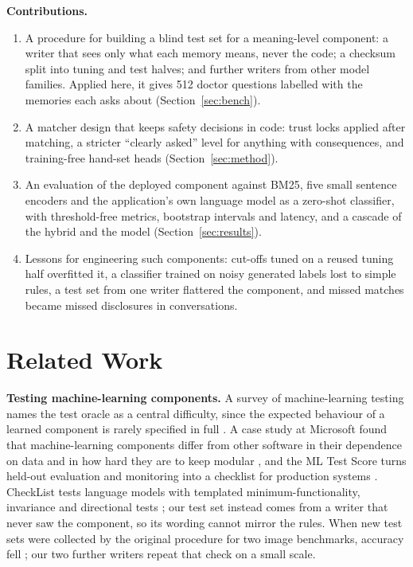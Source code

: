 \documentclass[sn-mathphys-num]{sn-jnl}
\begin{document}
\textbf{Contributions.}
\begin{enumerate}
\item A procedure for building a blind test set for a meaning-level component: a writer that sees only what each memory means, never the
code; a checksum split into tuning and test halves; and further writers from other model families. Applied here, it gives 512 doctor questions
labelled with the memories each asks about (Section~\ref{sec:bench}).
\item A matcher design that keeps safety decisions in code: trust locks applied after matching, a stricter ``clearly asked'' level for
anything with consequences, and training-free hand-set heads (Section~\ref{sec:method}).
\item An evaluation of the deployed component against BM25, five small sentence encoders and the application's own language model as a
zero-shot classifier, with threshold-free metrics, bootstrap intervals and latency, and a cascade of the hybrid and the model
(Section~\ref{sec:results}).
\item Lessons for engineering such components: cut-offs tuned on a reused tuning half overfitted it, a classifier trained on noisy generated
labels lost to simple rules, a test set from one writer flattered the component, and missed matches became missed disclosures in conversations.
\end{enumerate}

\section{Related Work}\label{sec:related}
\textbf{Testing machine-learning components.} A survey of machine-learning testing names the test oracle as a central difficulty, since the
expected behaviour of a learned component is rarely specified in full \cite{zhang2022mltesting}. A case study at Microsoft found that
machine-learning components differ from other software in their dependence on data and in how hard they are to keep modular
\cite{amershi2019se4ml}, and the ML Test Score turns held-out evaluation and monitoring into a checklist for production systems
\cite{breck2017mltestscore}. CheckList tests language models with templated minimum-functionality, invariance and directional tests
\cite{ribeiro2020checklist}; our test set instead comes from a writer that never saw the component, so its wording cannot mirror the rules.
When new test sets were collected by the original procedure for two image benchmarks, accuracy fell \cite{recht2019imagenet}; our two further
writers repeat that check on a small scale.
\end{document}
